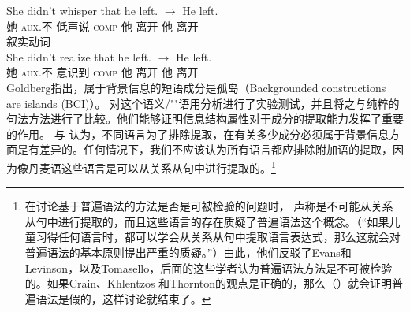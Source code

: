 \gll She didn't whisper that he left. $\to$ He left.\\
她 \textsc{aux}.不 低声说 \textsc{comp} 他 离开 {} 他 离开\\
\ex 叙实动词\\
\gll She didn't realize that he left. $\to$ He left.\\
她 \textsc{aux}.不 意识到 \textsc{comp} 他 离开 {} 他 离开\\
\zl
Goldberg指出，属于背景信息的短语成分是孤岛（Backgrounded constructions are islands (BCI)）。 \citet{AG2008a}对这个语义/""语用分析进行了实验测试，并且将之与纯粹的句法方法进行了比较。他们能够证明信息结构属性对于成分的提取能力发挥了重要的作用。 \citet[\S~3.H]{Erteschik73a-u}与 \citet[]{AG2008a}认为，不同语言为了排除提取，在有关多少成分必须属于背景信息方面是有差异的。任何情况下，我们不应该认为所有语言都应排除附加语的提取，因为像丹麦语这些语言是可以从关系从句中进行提取的。\footnote{%
在讨论基于普遍语法的方法是否是可被检验的问题时， \citet*[]{CKT2010a}声称是不可能从关系从句中进行提取的，而且这些语言的存在质疑了普遍语法这个概念。（“如果儿童习得任何语言时，都可以学会从关系从句中提取语言表达式，那么这就会对普遍语法的基本原则提出严重的质疑。”）由此，他们反驳了Evans和Levinson，以及Tomasello，后面的这些学者认为普遍语法方法是不可被检验的。如果Crain、Khlentzos 和Thornton的观点是正确的，那么（）就会证明普遍语法是假的，这样讨论就结束了。
}
